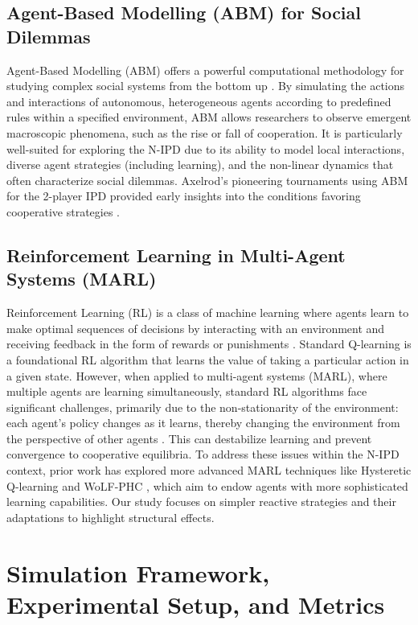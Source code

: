 \documentclass[]{llncs} %
\begin{document}
\subsection{Agent-Based Modelling (ABM) for Social Dilemmas}
Agent-Based Modelling (ABM) offers a powerful computational methodology for studying complex social systems from the bottom up \cite{Gilbert2007, Macal2010}. 
By simulating the actions and interactions of autonomous, heterogeneous agents according to predefined rules within a specified environment, ABM allows researchers to observe emergent macroscopic phenomena, such as the rise or fall of cooperation. It is particularly well-suited for exploring the N-IPD due to its ability to model local interactions, diverse agent strategies (including learning), and the non-linear dynamics that often characterize social dilemmas. Axelrod's pioneering tournaments using ABM for the 2-player IPD provided early insights into the conditions favoring cooperative strategies \cite{Axelrod}.

\subsection{Reinforcement Learning in Multi-Agent Systems (MARL)}
Reinforcement Learning (RL) is a class of machine learning where agents learn to make optimal sequences of decisions by interacting with an environment and receiving feedback in the form of rewards or punishments \cite{SuttonBarto2018}. 
Standard Q-learning is a foundational RL algorithm that learns the value of taking a particular action in a given state. However, when applied to multi-agent systems (MARL), where multiple agents are learning simultaneously, standard RL algorithms face significant challenges, primarily due to the non-stationarity of the environment: each agent's policy changes as it learns, thereby changing the environment from the perspective of other agents \cite{Busoniu2008}. 
This can destabilize learning and prevent convergence to cooperative equilibria. To address these issues within the N-IPD context, prior work has explored more advanced MARL techniques like Hysteretic Q-learning \cite{Matignon2007Hysteretic} and WoLF-PHC \cite{Bowling2002WoLF}, which aim to endow agents with more sophisticated learning capabilities. Our study focuses on simpler reactive strategies and their adaptations to highlight structural effects.


\section{Simulation Framework, Experimental Setup, and Metrics}
\label{sec:framework_and_methodology} %
\end{document}
